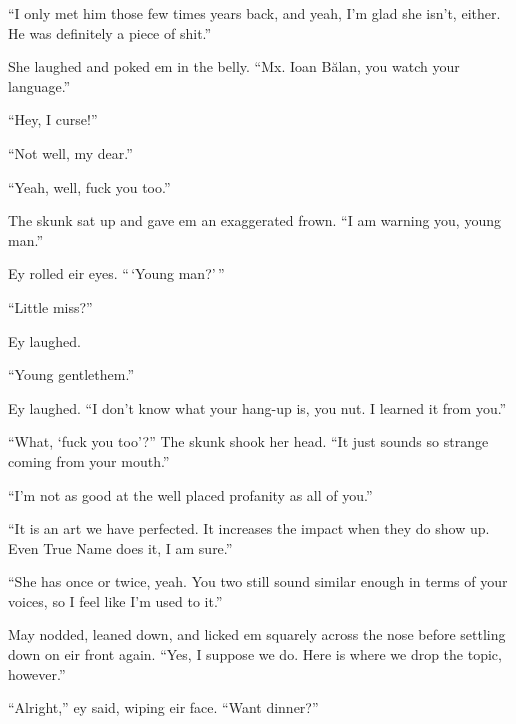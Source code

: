 ``I only met him those few times years back, and yeah, I'm glad she isn't, either. He was definitely a piece of shit.''

She laughed and poked em in the belly. ``Mx. Ioan Bălan, you watch your language.''

``Hey, I curse!''

``Not well, my dear.''

``Yeah, well, fuck you too.''

The skunk sat up and gave em an exaggerated frown. ``I am warning you, young man.''

Ey rolled eir eyes. ``\,`Young man?'\,''

``Little miss?''

Ey laughed.

``Young gentlethem.''

Ey laughed. ``I don't know what your hang-up is, you nut. I learned it from you.''

``What, `fuck you too'?'' The skunk shook her head. ``It just sounds so strange coming from your mouth.''

``I'm not as good at the well placed profanity as all of you.''

``It is an art we have perfected. It increases the impact when they do show up. Even True Name does it, I am sure.''

``She has once or twice, yeah. You two still sound similar enough in terms of your voices, so I feel like I'm used to it.''

May nodded, leaned down, and licked em squarely across the nose before settling down on eir front again. ``Yes, I suppose we do. Here is where we drop the topic, however.''

``Alright,'' ey said, wiping eir face. ``Want dinner?''
